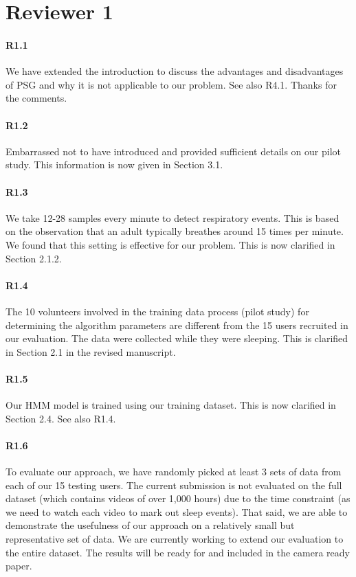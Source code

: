 \section*{Reviewer 1}
\vspace{-2mm}
\paragraph{R1.1} We have extended the introduction to discuss the advantages and disadvantages of PSG and why it is not applicable to our
problem. See also R4.1. Thanks for the comments.

\paragraph{R1.2} Embarrassed not to have introduced and provided sufficient details on our pilot study. This information is now given in Section 3.1.
\vspace{-2mm}
\paragraph{R1.3} We take 12-28 samples every minute to detect respiratory events. This is based on the observation that an adult typically
breathes around 15 times per minute. We found that this setting is effective for our problem. This is now clarified in Section 2.1.2.

\paragraph{R1.4} The 10 volunteers involved in the training data process (pilot study) for determining the algorithm parameters are different from the 15 users recruited in our
evaluation. The data were collected while they were sleeping. This is clarified in Section 2.1 in the revised manuscript.

\paragraph{R1.5} Our HMM model is trained using our training dataset. This is now clarified in Section 2.4. See also R1.4.
\vspace{-2mm}
\paragraph{R1.6} To evaluate our approach, we have randomly picked at least 3 sets of data from each of our 15 testing users.
The current submission is not evaluated on the full dataset (which contains videos of over 1,000 hours) due to the time constraint (as we
need to watch each video to mark out sleep events). That said, we are able to demonstrate the usefulness of our approach on a relatively
small but representative set of data. We are currently working to extend our evaluation to the entire dataset. The results will be ready
for and included in the camera ready paper.

